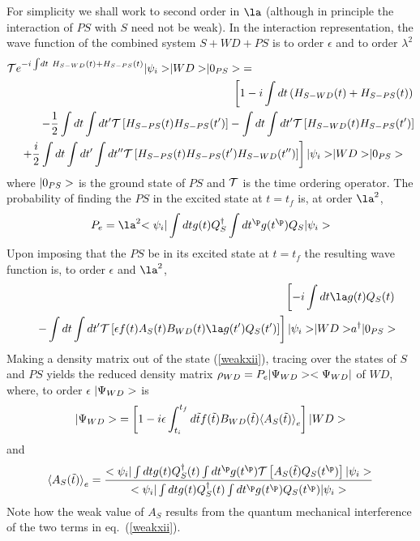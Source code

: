 For simplicity we shall work to second order in $\la$ (although in principle
the interaction of $PS$ with $S$ need not be weak).
In the interaction
representation, the wave function of the combined system $S+WD+PS$ is
to order $\epsilon$ and to order $\lambda^2$
\begin{eqnarray}
\lefteqn{{\cal T} e^{-i \int\! dt \ H_{S-WD}(t) + H_{S-PS}(t)}
\ket{\psi_i}\ket{WD}\ket{0_{PS}}=}\nonumber\\
& & \left[
1 -i \int dt \left( H_{S-WD}(t) + H_{S-PS}(t) \right)\right.
\nonumber\\
& & \ -{1 \over 2}
\int dt \int dt^\prime
{\cal T}\left[ H_{S-PS}(t)  H_{S-PS}(t^\prime) \right]
-
\int dt \int dt^\prime
{\cal T}\left[ H_{S-WD}(t)  H_{S-PS}(t^\prime) \right]
\nonumber\\
& & \left.\
+{i \over 2}
\int dt \int dt^\prime\int dt^{\prime\prime}
{\cal T}\left[ H_{S-PS}(t)  H_{S-PS}(t^\prime)
 H_{S-WD}(t^{\prime\prime})\right]
\right]
\ket{\psi_i}\ket{WD}\ket{0_{PS}}\quad
\label{weakxi}
\end{eqnarray}
where $\mbox{$ \vert 0_{PS} > $}$ is the ground state of $PS$ and ${\cal T}$ is
the time ordering operator.
The probability of finding the $PS$ in the excited state at $t=t_f$ is,
at order $\la^2$,
\begin{equation}
P_{e}
= \la^2  \bra{\psi_i} \int dt g(t) Q^\dagger_S
\int dt^\p g(t^\p) Q_S \ket{\psi_i}
\end{equation}
Upon imposing that the
$PS$ be in its excited state at $t=t_f$ the
resulting
wave function  is, to order $\epsilon$ and $\la^2$,
\begin{eqnarray}
&&\quad \left [
-i \int dt \la g(t) Q_S(t)  \right.
\nonumber\\
&& \left. -
\int dt \int dt^\prime
{\cal T}
\left[\epsilon f(t) A_S(t) B_{WD}(t) \la g(t^\prime) Q_S(t^\prime)
\right]
\right]
\ket{\psi_i}\ket{WD}a^\dagger\ket{0_{PS}}
\label{weakxii}\end{eqnarray}
Making a density matrix out of the state (\ref{weakxii}),
tracing over the states of $S$ and $PS$
yields the reduced density matrix $\rho_{WD} =
P_{e}\mbox{$ \vert \Psi_{WD} > $}\mbox{$ < \Psi_{WD} \vert $}$ of $WD$, where, to order $\epsilon$
$\mbox{$ \vert \Psi_{WD} > $}$ is
\begin{equation}
\mbox{$ \vert \Psi_{WD} > $}=\left[
1 - i \epsilon \int_{t_i}^{t_f} d\tilde t f(\tilde t) B_{WD}(\tilde t)
\mbox{$ \langle A_{S}(\tilde t) \rangle $}_{e} \right] \mbox{$ \vert WD > $}
\label{weakxiii}
\end{equation}
and
\begin{equation}
\bk{A_{S}(\tilde t)}_{e} =
{ \bi \int dt g(t) Q_S^\dagger (t)  \int dt^\p
g(t^\p) {\cal T } \left[ A_S(\tilde t) Q_S(t^\p) \right]
\ki \over \bi \int dt g(t) Q_S^\dagger (t) \int
dt^\p g(t^\p) Q_S(t^\p) \ki} \label{weakxiv} \end{equation}
Note how the weak value of $A_S$ results from the quantum mechanical
interference of the two terms in eq.~(\ref{weakxii}).

